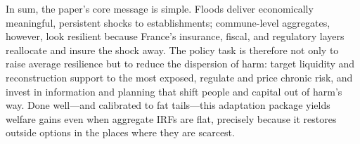 In sum, the paper’s core message is simple. Floods deliver economically meaningful, persistent shocks to establishments; commune-level aggregates, however, look resilient because France’s insurance, fiscal, and regulatory layers reallocate and insure the shock away. The policy task is therefore not only to raise average resilience but to reduce the dispersion of harm: target liquidity and reconstruction support to the most exposed, regulate and price chronic risk, and invest in information and planning that shift people and capital out of harm’s way. Done well—and calibrated to fat tails—this adaptation package yields welfare gains even when aggregate IRFs are flat, precisely because it restores outside options in the places where they are scarcest.









